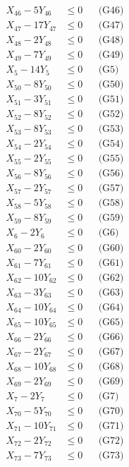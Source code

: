 \documentclass[a4paper,10pt]{article}
\begin{document}
{\begin{align}
X_{46} - 5Y_{46} &\leq 0 && \text{(G46)} \\
X_{47} - 17Y_{47} &\leq 0 && \text{(G47)} \\
X_{48} - 2Y_{48} &\leq 0 && \text{(G48)} \\
X_{49} - 7Y_{49} &\leq 0 && \text{(G49)} \\
X_{5} - 14Y_{5} &\leq 0 && \text{(G5)} \\
X_{50} - 8Y_{50} &\leq 0 && \text{(G50)} \\
X_{51} - 3Y_{51} &\leq 0 && \text{(G51)} \\
X_{52} - 8Y_{52} &\leq 0 && \text{(G52)} \\
X_{53} - 8Y_{53} &\leq 0 && \text{(G53)} \\
X_{54} - 2Y_{54} &\leq 0 && \text{(G54)} \\
X_{55} - 2Y_{55} &\leq 0 && \text{(G55)} \\
X_{56} - 8Y_{56} &\leq 0 && \text{(G56)} \\
X_{57} - 2Y_{57} &\leq 0 && \text{(G57)} \\
X_{58} - 5Y_{58} &\leq 0 && \text{(G58)} \\
X_{59} - 8Y_{59} &\leq 0 && \text{(G59)} \\
X_{6} - 2Y_{6} &\leq 0 && \text{(G6)} \\
X_{60} - 2Y_{60} &\leq 0 && \text{(G60)} \\
X_{61} - 7Y_{61} &\leq 0 && \text{(G61)} \\
X_{62} - 10Y_{62} &\leq 0 && \text{(G62)} \\
\allowbreak
X_{63} - 3Y_{63} &\leq 0 && \text{(G63)} \\
X_{64} - 10Y_{64} &\leq 0 && \text{(G64)} \\
X_{65} - 10Y_{65} &\leq 0 && \text{(G65)} \\
X_{66} - 2Y_{66} &\leq 0 && \text{(G66)} \\
X_{67} - 2Y_{67} &\leq 0 && \text{(G67)} \\
X_{68} - 10Y_{68} &\leq 0 && \text{(G68)} \\
X_{69} - 2Y_{69} &\leq 0 && \text{(G69)} \\
X_{7} - 2Y_{7} &\leq 0 && \text{(G7)} \\
X_{70} - 5Y_{70} &\leq 0 && \text{(G70)} \\
X_{71} - 10Y_{71} &\leq 0 && \text{(G71)} \\
X_{72} - 2Y_{72} &\leq 0 && \text{(G72)} \\
X_{73} - 7Y_{73} &\leq 0 && \text{(G73)} \\

\end{align}}
\end{document}
